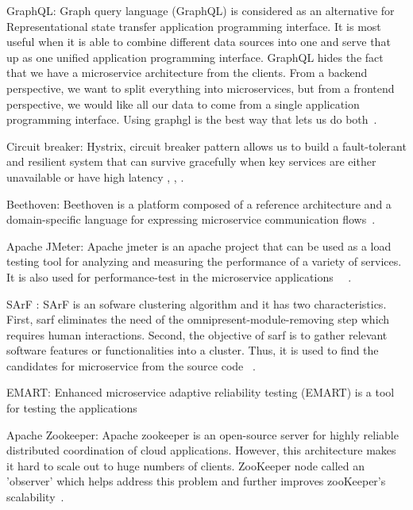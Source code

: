 \par GraphQL: Graph query language (GraphQL) is considered as an alternative for Representational state transfer application programming interface. It is most useful when it is able to combine different data sources into one and serve that up as one unified application programming interface. GraphQL hides the fact that we have a microservice architecture from the clients. From a backend perspective, we want to split everything into microservices, but from a frontend perspective, we would like all our data to come from a single application programming interface. Using graphgl is the best way that lets us do both~\cite{Ghebremicael2017, wang2020, overeem2018, gozneli2020}.

\par Circuit breaker: Hystrix, circuit breaker pattern allows us to build a fault-tolerant and resilient system that can survive gracefully when key services are either unavailable or have high latency \cite{Kalske2017paper}, \cite{Rodrigue2016}, \cite{Uber}. 

\par Beethoven: Beethoven is a platform composed of a reference architecture and a domain-specific language for expressing microservice communication flows~\cite{Monteiro2020}.

\par Apache JMeter: Apache jmeter is an apache project that can be used as a load testing tool for analyzing and measuring the performance of a variety of services. It is also used for performance-test in the microservice applications ~\cite{Hou2019}~\cite{Johansson2019}.

\par SArF : SArF is an sofware clustering algorithm and it has two characteristics. First, sarf eliminates the need of the omnipresent-module-removing step which requires human interactions. Second, the objective of sarf is to gather relevant software features or functionalities into a cluster. Thus, it is used to find the candidates for microservice from the source code ~\cite{Kamimura2018}.

\par EMART: Enhanced microservice adaptive reliability testing (EMART) is a tool for testing the applications~\cite{Russo2020}

\par Apache Zookeeper: Apache zookeeper is an open-source server for highly reliable distributed coordination of cloud applications. However, this architecture makes it hard to scale out to huge numbers of clients. ZooKeeper node called an 'observer' which helps address this problem and further improves zooKeeper's scalability~\cite{Kalske2017paper, KalskeM2017}.

